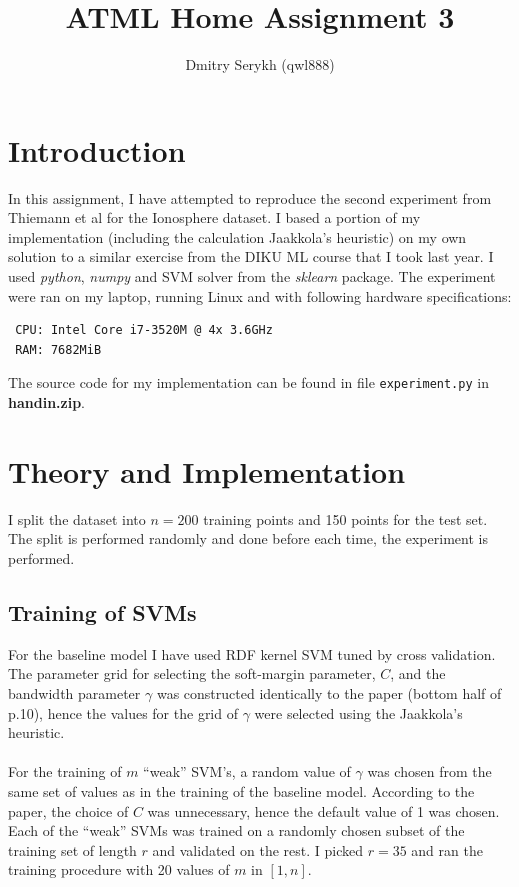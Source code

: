 \documentclass[a4paper]{article}
\title{\vspace{-5cm}ATML Home Assignment 3}
\author{Dmitry Serykh (qwl888)}
\begin{document}
\maketitle
\section{Introduction}
In this assignment, I have attempted to reproduce the second experiment from
Thiemann et al for the Ionosphere dataset. I based a portion of my implementation
(including the calculation Jaakkola's heuristic) on my own solution to a similar
exercise from the DIKU ML course that I took last year. I used \emph{python},
\emph{numpy} and SVM solver from the \emph{sklearn} package. The experiment were
ran on my laptop, running Linux and with following hardware specifications:
\begin{verbatim}
 CPU: Intel Core i7-3520M @ 4x 3.6GHz
 RAM: 7682MiB
\end{verbatim}
The source code for my
implementation can be found in file \texttt{experiment.py} in
\textbf{handin.zip}.

\section{Theory and Implementation}
I split the dataset into $n=200$ training points and 150 points for the test
set. The split is performed randomly and done before each time, the experiment is performed.

\subsection{Training of SVMs}
For the baseline model I have used RDF kernel SVM tuned by cross validation. The
parameter grid for selecting the soft-margin parameter, $C$, and the bandwidth
parameter $\gamma$ was constructed identically to the paper (bottom half of
p.10), hence the values for the grid of $\gamma$ were selected using the Jaakkola's
heuristic. \\\\
For the training of $m$ ``weak'' SVM's, a random value of
$\gamma$ was chosen from the same set of values as in the training of the
baseline model. According to the paper, the choice of $C$ was unnecessary,
hence the default value of 1 was chosen.
Each of the ``weak'' SVMs was trained on a randomly chosen subset of the
training set of length $r$ and validated on the rest. I picked $r=35$ and ran
the training procedure with 20 values of $m$ in $[1, n]$.
\end{document}
